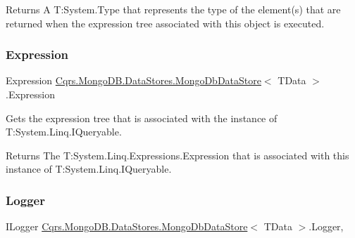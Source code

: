 \begin{DoxyReturn}{Returns}
A T\+:\+System.\+Type that represents the type of the element(s) that are returned when the expression tree associated with this object is executed. 
\end{DoxyReturn}
\mbox{\label{classCqrs_1_1MongoDB_1_1DataStores_1_1MongoDbDataStore_ade387c1d511dfad22ff7eb752fb842e5_ade387c1d511dfad22ff7eb752fb842e5}} 
\subsubsection{\texorpdfstring{Expression}{Expression}}
{\footnotesize\ttfamily Expression \hyperlink{classCqrs_1_1MongoDB_1_1DataStores_1_1MongoDbDataStore}{Cqrs.\+Mongo\+D\+B.\+Data\+Stores.\+Mongo\+Db\+Data\+Store}$<$ T\+Data $>$.Expression\hspace{0.3cm}{\ttfamily [get]}}



Gets the expression tree that is associated with the instance of T\+:\+System.\+Linq.\+I\+Queryable. 

\begin{DoxyReturn}{Returns}
The T\+:\+System.\+Linq.\+Expressions.\+Expression that is associated with this instance of T\+:\+System.\+Linq.\+I\+Queryable. 
\end{DoxyReturn}
\mbox{\label{classCqrs_1_1MongoDB_1_1DataStores_1_1MongoDbDataStore_a1258497689d7f866b2bc219cd8268b7d_a1258497689d7f866b2bc219cd8268b7d}} 
\subsubsection{\texorpdfstring{Logger}{Logger}}
{\footnotesize\ttfamily I\+Logger \hyperlink{classCqrs_1_1MongoDB_1_1DataStores_1_1MongoDbDataStore}{Cqrs.\+Mongo\+D\+B.\+Data\+Stores.\+Mongo\+Db\+Data\+Store}$<$ T\+Data $>$.Logger\hspace{0.3cm}{\ttfamily [get]}, {\ttfamily [protected]}}



